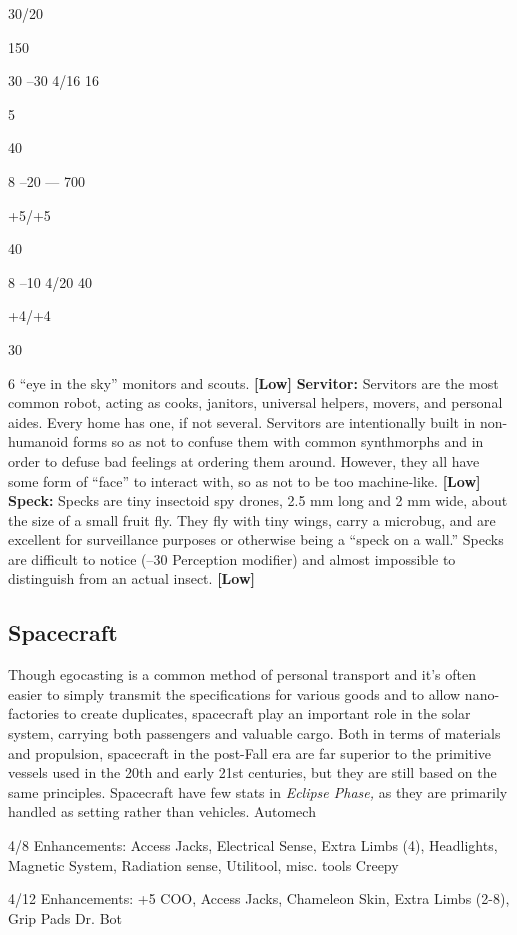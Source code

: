 30/20

150

30
–30
4/16
16

5

40

8
–20
—
700

+5/+5

40

8
–10
4/20
40

+4/+4

30

6
``eye in the sky'' monitors and scouts. \textbf{[Low]}
\textbf{Servitor:  }Servitors are the most common robot, 
acting as cooks, janitors, universal helpers, movers, 
and personal aides. Every home has one, if not several. 
Servitors are intentionally built in non-humanoid 
forms so as not to confuse them with common 
synthmorphs and in order to defuse bad feelings at 
ordering them around. However, they all have some 
form of ``face'' to interact with, so as not to be too 
machine-like. \textbf{[Low]}
\textbf{Speck:} Specks are tiny insectoid spy drones, 2.5 mm 
long and 2 mm wide, about the size of a small fruit fly. 
They fly with tiny wings, carry a microbug, and are 
excellent for surveillance purposes or otherwise being 
a ``speck on a wall.'' Specks are difficult to notice (–30 
Perception modifier) and almost impossible to distinguish
from an actual insect. \textbf{[Low]}

\subsection{Spacecraft}

Though egocasting is a common method of personal 
transport and it's often easier to simply transmit the 
specifications for various goods and to allow nano-factories
to create duplicates, spacecraft play an
important role in the solar system, carrying both passengers
and valuable cargo. Both in terms of materials
and propulsion, spacecraft in the post-Fall era are far 
superior to the primitive vessels used in the 20th and 
early 21st centuries, but they are still based on the 
same principles.
Spacecraft have few stats in \textit{Eclipse Phase,} as they 
are primarily handled as setting rather than vehicles. 
Automech

4/8
Enhancements: Access Jacks, Electrical Sense, Extra Limbs (4), Headlights, Magnetic System, Radiation sense, Utilitool, misc. tools
Creepy 

4/12
Enhancements:\textbf{ }+5 COO, Access Jacks, Chameleon Skin, Extra Limbs (2-8), Grip Pads
Dr. Bot

